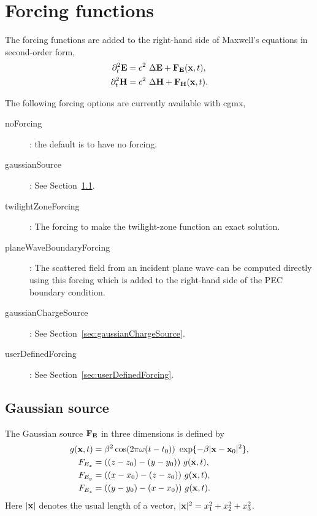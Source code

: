 \section{Forcing functions} \label{sec:forcings}

The forcing functions are added to the right-hand side of Maxwell's equations in
second-order form,
\begin{align}
  \partial_t^2 \mathbf{ E} &= c^2~ \Delta \mathbf{ E}  + \mathbf{ F}_{\mathbf{ E}}(\mathbf{ x},t), \\
  \partial_t^2 \mathbf{ H} &= c^2~ \Delta \mathbf{ H}  + \mathbf{ F}_{\mathbf{ H}}(\mathbf{ x},t).
\end{align}


\noindent The following forcing options are currently available with cgmx,
\begin{description}
  \item[noForcing]: the default is to have no forcing.
  \item[gaussianSource]: See Section~\ref{sec:gaussianSource}.
  \item[twilightZoneForcing]: The forcing to make the twilight-zone function an exact solution.
  \item[planeWaveBoundaryForcing]: The scattered field from an incident plane wave can be computed directly using this forcing
         which is added to the right-hand side of the PEC boundary condition.
  \item[gaussianChargeSource]: See Section~\ref{sec:gaussianChargeSource}.
  \item[userDefinedForcing] : See Section~\ref{sec:userDefinedForcing}.
\end{description}



\subsection{Gaussian source} \label{sec:gaussianSource}

The Gaussian source $\mathbf{ F}_{\mathbf{ E}}$ in three dimensions is defined by 
\begin{align*}
   g(\mathbf{ x},t) & = \beta^2 \cos(2 \pi \omega(t-t_0)) ~\exp\{ -\beta |\mathbf{ x}-\mathbf{ x}_0|^2 \}, \\
   F_{E_x} &= ((z-z_0) - (y-y_0) ) ~g(\mathbf{ x},t), \\ 
   F_{E_y} &= ((x-x_0) - (z-z_0) ) ~g(\mathbf{ x},t), \\ 
   F_{E_z} &= ((y-y_0) - (x-x_0) ) ~g(\mathbf{ x},t). 
\end{align*}
Here $|\mathbf{ x}|$ denotes the usual length of a vector, $|\mathbf{ x}|^2= x_1^2 + x_2^2 + x_3^2$.

